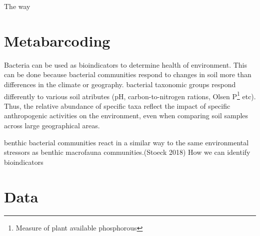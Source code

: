 The way 




\section{Metabarcoding}
Bacteria can be used as bioindicators to determine health of environment. This can be done because bacterial communities respond to changes in soil more than differences in the climate or geography.  bacterial taxonomic groups respond differently to various soil atributes (pH, carbon-to-nitrogen rations, Olsen P\footnote{Measure of plant available phosphorous} etc). Thus, the relative abundance of specific taxa reflect the impact of specific anthropogenic activities on the environment, even when comparing soil samples across large geographical areas.\cite{hermans_bacteria_2016}

benthic bacterial communities react in a
similar way to the same environmental stressors as benthic macrofauna
communities.(Stoeck 2018)
How we can identify bioindicators 



\section{Data}
